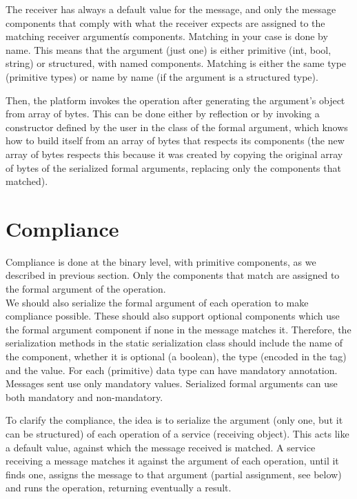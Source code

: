 The receiver has always a default value for the message, and only the message components that comply with what the receiver
expects are assigned to the matching receiver argumentís components. Matching in your case is done by name. This means that
the argument (just one) is either primitive (int, bool, string) or structured, with named components. Matching is either the
same type (primitive types) or name by name (if the argument is a structured type).

Then, the platform invokes the operation after generating the argument’s object from array of bytes.
This can be done either by reflection or by invoking a constructor defined by the user in the class of the formal argument,
which knows how to build itself from an array of bytes that respects its components (the new array of bytes respects this
because it was created by copying the original array of bytes of the serialized formal arguments, replacing only the components
 that matched).




\section{Compliance}
\label{section:compliance}

Compliance is done at the binary level, with primitive components, as we described in previous section. Only the components
that match are assigned to the formal argument of the operation.\\

We should also serialize the formal argument of each operation to make compliance possible. These should also support
optional components which use the formal argument component if none in the message matches it. Therefore, the serialization
methods in the static serialization class should include the name of the component, whether it is optional (a boolean), the type
(encoded in the tag) and the value. For each (primitive) data type can have mandatory annotation.
Messages sent use only mandatory values. Serialized formal arguments can use both mandatory and non-mandatory.

To clarify the compliance, the idea is to serialize the argument (only one, but it can be structured) of each operation of a service
(receiving object). This acts like a default value, against which the message received is matched. A service receiving a message matches
it against the argument of each operation, until it finds one, assigns the message to that argument (partial assignment, see below) and
runs the operation, returning eventually a result.


